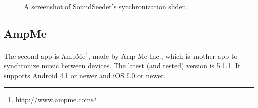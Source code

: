 \begin{figure}[h!]
\begin{minipage}[b]{0.45\textwidth}
        \caption{A screenshot of SoundSeeder's synchronization slider.}\label{fig:soundseeder_slider}
    \end{minipage}
\end{figure}

\subsection{AmpMe}\label{subsec:ampme}
The second app is AmpMe\footnote{http://www.ampme.com}, made by Amp Me Inc., which is another app to synchronize music between devices.
The latest (and tested) version is 5.1.1.
It supports Android 4.1 or newer and iOS 9.0 or newer.

